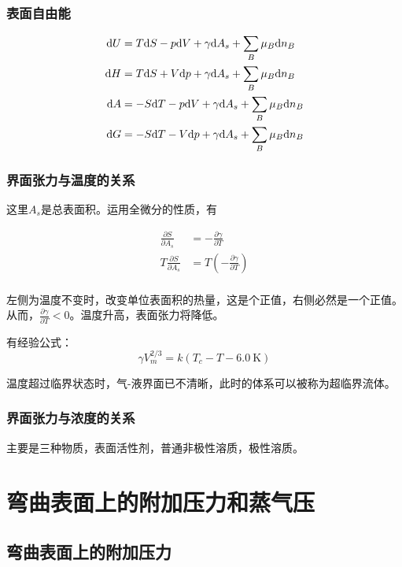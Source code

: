 \subsubsection{表面自由能}

\begin{align*}
    \mathrm{d} U & = T \mathrm{d} S- p \mathrm{d} V+ \gamma\mathrm{d} A_s + \sum_B \mu_B \mathrm{d} n_B    \\
    \mathrm{d} H & =T \mathrm{d} S+ V \mathrm{d} p + \gamma\mathrm{d} A_s + \sum_B \mu_B \mathrm{d} n_B    \\
    \mathrm{d} A & = -S \mathrm{d} T- p \mathrm{d} V+ \gamma\mathrm{d} A_s + \sum_B \mu_B \mathrm{d} n_B   \\
    \mathrm{d} G & = -S \mathrm{d} T - V \mathrm{d} p + \gamma\mathrm{d} A_s + \sum_B \mu_B \mathrm{d} n_B
\end{align*}


\subsubsection{界面张力与温度的关系}

这里$A_s$是总表面积。运用全微分的性质，有

\begin{align*}
    \frac{\partial S}{\partial A_s}   & =  -\frac{\partial \gamma}{\partial T}                  \\
    T \frac{\partial S}{\partial A_s} & = T \left(  -\frac{\partial \gamma}{\partial T} \right) \\
\end{align*}

左侧为温度不变时，改变单位表面积的热量，这是个正值，右侧必然是一个正值。从而，$\frac{\partial \gamma}{\partial T} < 0$。温度升高，表面张力将降低。

有经验公式：
\begin{equation*}
    \gamma V_m^{2/3} = k \left(T_c - T - 6.0 \ \mathrm{K}\right)
\end{equation*}

温度超过临界状态时，气-液界面已不清晰，此时的体系可以被称为超临界流体。

\subsubsection{界面张力与浓度的关系}

主要是三种物质，表面活性剂，普通非极性溶质，极性溶质。


\section{弯曲表面上的附加压力和蒸气压}
\subsection{弯曲表面上的附加压力}

